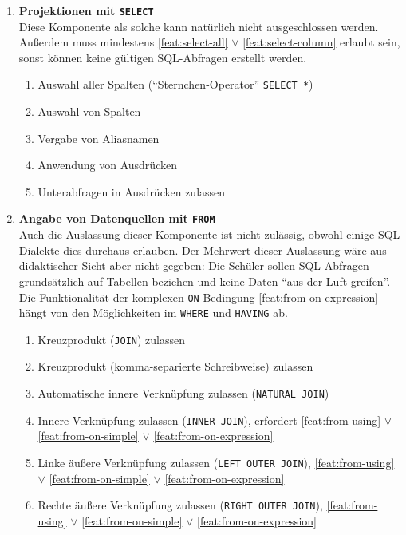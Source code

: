 \begin{enumerate}
\item \textbf{Projektionen mit \texttt{SELECT}} \\
  Diese Komponente als solche kann natürlich nicht ausgeschlossen werden. Außerdem muss mindestens \ref{feat:select-all} $\lor$ \ref{feat:select-column} erlaubt sein, sonst können keine gültigen SQL-Abfragen erstellt werden.
  \begin{enumerate}
  \item \label{feat:select-all} Auswahl aller Spalten (``Sternchen-Operator'' \texttt{SELECT *})
  \item \label{feat:select-column} Auswahl von Spalten
  \item \label{feat:select-alias} Vergabe von Aliasnamen
  \item \label{feat:select-expression} Anwendung von Ausdrücken
  \item \label{feat:select-sub} Unterabfragen in Ausdrücken zulassen
  \end{enumerate}
\item \textbf{Angabe von Datenquellen mit \texttt{FROM}} \\
  Auch die Auslassung dieser Komponente ist nicht zulässig, obwohl einige SQL Dialekte dies durchaus erlauben. Der Mehrwert dieser Auslassung wäre aus didaktischer Sicht aber nicht gegeben: Die Schüler sollen SQL Abfragen grundsätzlich auf Tabellen beziehen und keine Daten ``aus der Luft greifen''. Die Funktionalität der komplexen \texttt{ON}-Bedingung \ref{feat:from-on-expression} hängt von den Möglichkeiten im \texttt{WHERE} und \texttt{HAVING} ab.
  \begin{enumerate}
  \item \label{feat:from-cross-join} Kreuzprodukt (\texttt{JOIN}) zulassen
  \item \label{feat:from-cross-comma} Kreuzprodukt (komma-separierte Schreibweise) zulassen
  \item \label{feat:from-natural-join} Automatische innere Verknüpfung zulassen (\texttt{NATURAL JOIN})
  \item \label{feat:from-inner-join} Innere Verknüpfung zulassen (\texttt{INNER JOIN}), erfordert \ref{feat:from-using} $\lor$ \ref{feat:from-on-simple} $\lor$ \ref{feat:from-on-expression}
  \item \label{feat:from-left-join} Linke äußere Verknüpfung zulassen (\texttt{LEFT OUTER JOIN}), \ref{feat:from-using} $\lor$ \ref{feat:from-on-simple} $\lor$ \ref{feat:from-on-expression}
  \item \label{feat:from-right-join} Rechte äußere Verknüpfung zulassen (\texttt{RIGHT OUTER JOIN}), \ref{feat:from-using} $\lor$ \ref{feat:from-on-simple} $\lor$ \ref{feat:from-on-expression}

\end{enumerate}
\end{enumerate}
